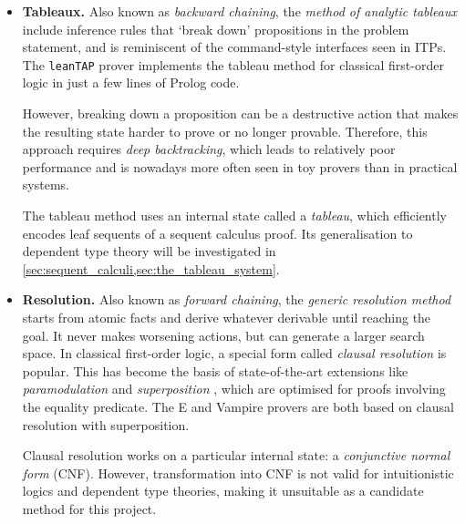 \documentclass[twoside]{report}
\begin{document}
\begin{itemize}
    \item \textbf{Tableaux.} Also known as \emph{backward chaining}, the \emph{method of analytic tableaux} \cite{smullyan1968first} include inference rules that `break down' propositions in the problem statement, and is reminiscent of the command-style interfaces seen in ITPs. The \texttt{leanTAP} prover \cite{beckert1995leantap} implements the tableau method for classical first-order logic in just a few lines of Prolog code.

          However, breaking down a proposition can be a destructive action that makes the resulting state harder to prove or no longer provable. Therefore, this approach requires \emph{deep backtracking}, which leads to relatively poor performance and is nowadays more often seen in toy provers than in practical systems.

          The tableau method uses an internal state called a \emph{tableau}, which efficiently encodes leaf sequents of a sequent calculus proof. Its generalisation to dependent type theory will be investigated in \cref{sec:sequent_calculi,sec:the_tableau_system}.

    \item \textbf{Resolution.} Also known as \emph{forward chaining}, the \emph{generic resolution method} \cite{mints1988gentzen,tammet1997resolution} starts from atomic facts and derive whatever derivable until reaching the goal. It never makes worsening actions, but can generate a larger search space. %
          In classical first-order logic, a special form called \emph{clausal resolution} \cite{robinson1965machine} is popular. This has become the basis of state-of-the-art extensions like \emph{paramodulation} \cite{robinson1983paramodulation} and \emph{superposition} \cite{bachmair1994rewrite}, which are optimised for proofs involving the equality predicate. The E \cite{schulz2019faster} and Vampire \cite{kovacs2013first} provers are both based on clausal resolution with superposition.

          Clausal resolution works on a particular internal state: a \emph{conjunctive normal form} (CNF). However, transformation into CNF is not valid for intuitionistic logics and dependent type theories, making it unsuitable as a candidate method for this project.


\end{itemize}
\end{document}
